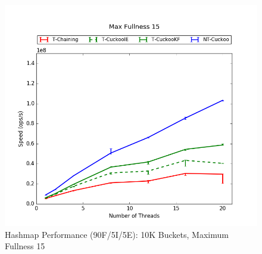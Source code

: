 \begin{figure}[H]
    \centering
	\begin{minipage}{0.5\textwidth}\includegraphics[width=\textwidth]{maps/15HM10K:F90,I5,E5.png} 
    \end{minipage}
	\begin{minipage}{0.4\textwidth}
    
    \end{minipage}
    \caption{Hashmap Performance (90F/5I/5E): 10K Buckets, Maximum Fullness 15}
\end{figure}

